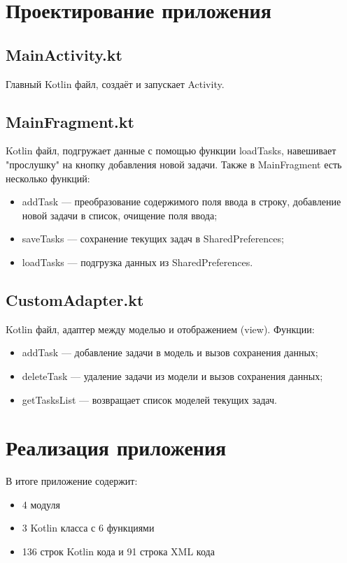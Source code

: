 \documentclass[a4paper,12pt]{article}
\begin{document}

\section{Проектирование приложения}
\subsection{MainActivity.kt}
Главный Kotlin файл, создаёт и запускает Activity.
\subsection{MainFragment.kt}
Kotlin файл, подгружает данные с помощью функции loadTasks, навешивает "прослушку" на кнопку добавления новой задачи. Также в MainFragment есть несколько функций:
\begin{itemize}
    \item addTask --- преобразование содержимого поля ввода в строку, добавление новой задачи в список, очищение поля ввода;
    \item saveTasks --- сохранение текущих задач в SharedPreferences;
    \item loadTasks --- подгрузка данных из SharedPreferences.  
\end{itemize}
\subsection{CustomAdapter.kt}
Kotlin файл, адаптер между моделью и отображением (view). Функции:
\begin{itemize}
    \item addTask --- добавление задачи в модель и вызов сохранения данных;
    \item deleteTask --- удаление задачи из модели и вызов сохранения данных;
    \item getTasksList --- возвращает список моделей текущих задач.  
\end{itemize}


\section{Реализация приложения}
В итоге приложение содержит:
\begin{itemize}
    \item 4 модуля
    \item 3 Kotlin класса с 6 функциями
    \item 136 строк Kotlin кода и 91 строка XML кода
\end{itemize}
\end{document}
